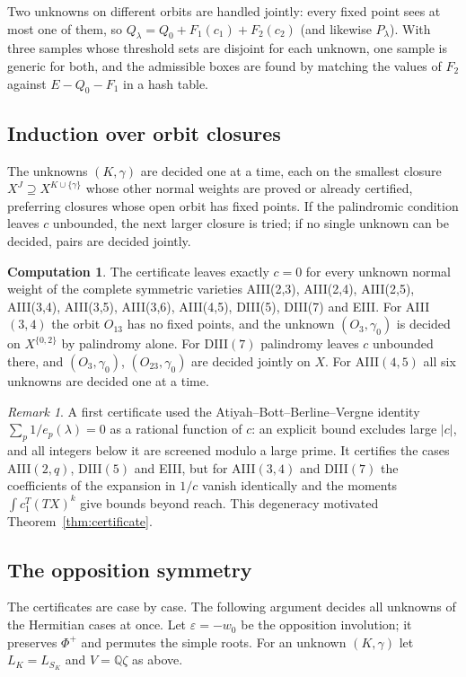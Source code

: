 \documentclass[11pt]{amsart}
\theoremstyle{definition}
\newtheorem{computation}[theorem]{Computation}
\theoremstyle{remark}
\newtheorem{remark}[theorem]{Remark}
\newcommand{\QQ}{\mathbb{Q}}
\begin{document}
Two unknowns on different orbits are handled jointly: every fixed point
sees at most one of them, so $Q_\lambda = Q_0+F_1(c_1)+F_2(c_2)$ (and
likewise $P_\lambda$). With three samples whose threshold sets are disjoint
for each unknown, one sample is generic for both, and the admissible boxes
are found by matching the values of $F_2$ against $E-Q_0-F_1$ in a hash
table.

\subsection{Induction over orbit closures}
The unknowns $(K,\gamma)$ are decided one at a time, each on the smallest
closure $X^J\supseteq X^{K\cup\{\gamma\}}$ whose other normal weights are
proved or already certified, preferring closures whose open orbit has fixed
points. If the palindromic condition leaves $c$ unbounded, the next larger
closure is tried; if no single unknown can be decided, pairs are decided
jointly.

\begin{computation}\label{comp:certified}
The certificate leaves exactly $c=0$ for every unknown normal weight of the
complete symmetric varieties AIII(2,3), AIII(2,4), AIII(2,5), AIII(3,4),
AIII(3,5), AIII(3,6), AIII(4,5), DIII(5), DIII(7) and EIII.
For AIII$(3,4)$ the orbit $O_{13}$ has no fixed points, and the unknown
$(O_3,\gamma_0)$ is decided on $X^{\{0,2\}}$ by palindromy alone. For
DIII$(7)$ palindromy leaves $c$ unbounded there, and $(O_3,\gamma_0)$,
$(O_{23},\gamma_0)$ are decided jointly on $X$. For AIII$(4,5)$ all six
unknowns are decided one at a time.
\end{computation}

\begin{remark}
A first certificate used the Atiyah--Bott--Berline--Vergne identity
$\sum_p 1/e_p(\lambda)=0$ \cite{AtiyahBott84,BerlineVergne} as a rational
function of $c$: an explicit bound excludes large $|c|$, and all integers
below it are screened modulo a large prime. It certifies the cases
AIII$(2,q)$, DIII$(5)$ and EIII, but for AIII$(3,4)$ and DIII$(7)$ the
coefficients of the expansion in $1/c$ vanish identically and the moments
$\int c_1^T(TX)^k$ give bounds beyond reach. This degeneracy motivated
Theorem~\ref{thm:certificate}.
\end{remark}

\subsection{The opposition symmetry}
The certificates are case by case. The following argument decides all
unknowns of the Hermitian cases at once. Let $\varepsilon=-w_0$ be the
opposition involution; it preserves $\Phi^+$ and permutes the simple roots.
For an unknown $(K,\gamma)$ let $L_K=L_{S_K}$ and $V=\QQ\zeta$ as above.
\end{document}
